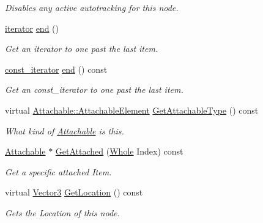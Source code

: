 \begin{DoxyCompactItemize}
\begin{DoxyCompactList}\small\item\em Disables any active autotracking for this node. \item\end{DoxyCompactList}\item 
\hyperlink{classphys_1_1WorldNode_ad7f553f256c4e500e35c36196db26287}{iterator} \hyperlink{classphys_1_1WorldNode_ad71a9f4e8aa60767997e900a1fd80051}{end} ()
\begin{DoxyCompactList}\small\item\em Get an iterator to one past the last item. \item\end{DoxyCompactList}\item 
\hyperlink{classphys_1_1WorldNode_a76139100e549fd31310cd1bed75338ba}{const\_\-iterator} \hyperlink{classphys_1_1WorldNode_a25a2a1866850812cab926c31598344a2}{end} () const 
\begin{DoxyCompactList}\small\item\em Get an const\_\-iterator to one past the last item. \item\end{DoxyCompactList}\item 
virtual \hyperlink{classphys_1_1Attachable_acd1fca033e7cc0bb3024a92d466d213a}{Attachable::AttachableElement} \hyperlink{classphys_1_1WorldNode_a166d3204c44959c1c77498f1f03e1ec9}{GetAttachableType} () const 
\begin{DoxyCompactList}\small\item\em What kind of \hyperlink{classphys_1_1Attachable}{Attachable} is this. \item\end{DoxyCompactList}\item 
\hyperlink{classphys_1_1Attachable}{Attachable} $\ast$ \hyperlink{classphys_1_1WorldNode_ad29bcbb80647d3a792af6578e6bc4c13}{GetAttached} (\hyperlink{namespacephys_a460f6bc24c8dd347b05e0366ae34f34a}{Whole} Index) const 
\begin{DoxyCompactList}\small\item\em Get a specific attached Item. \item\end{DoxyCompactList}\item 
virtual \hyperlink{classphys_1_1Vector3}{Vector3} \hyperlink{classphys_1_1WorldNode_a1e45730a3e7ad6bc30dc98982fe64624}{GetLocation} () const 
\begin{DoxyCompactList}\small\item\em Gets the Location of this node. \item\end{DoxyCompactList}\item 

\end{DoxyCompactItemize}
